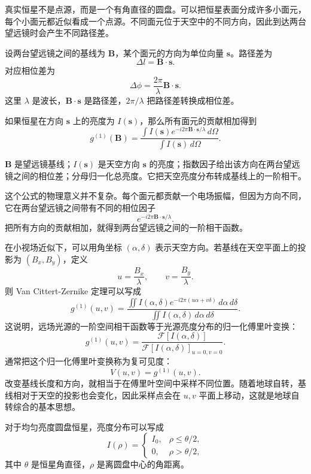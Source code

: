 真实恒星不是点源，而是一个有角直径的圆盘。可以把恒星表面分成许多小面元，每个小面元都近似看成一个点源。不同面元位于天空中的不同方向，因此到达两台望远镜时会产生不同路径差。

设两台望远镜之间的基线为 \(\mathbf B\)，某个面元的方向为单位向量 \(\mathbf s\)。路径差为
\[
  \Delta l=\mathbf B\cdot \mathbf s.
\]
对应相位差为
\[
  \Delta\phi
  =
  \frac{2\pi}{\lambda}\mathbf B\cdot\mathbf s.
\]
这里 \(\lambda\) 是波长，\(\mathbf B\cdot\mathbf s\) 是路径差，\(2\pi/\lambda\) 把路径差转换成相位差。

如果恒星在方向 \(\mathbf s\) 上的亮度为 \(I(\mathbf s)\)，那么所有面元的贡献相加得到
\[
  g^{(1)}(\mathbf B)
  =
  \frac{
    \int
    I(\mathbf s)
    e^{-i2\pi\mathbf B\cdot\mathbf s/\lambda}
    \,d\Omega
  }{
    \int
    I(\mathbf s)\,d\Omega
  }.
\]
\begin{formulaexplain}[空间相干解读]
\(\mathbf B\) 是望远镜基线；\(I(\mathbf s)\) 是天空方向 \(\mathbf s\) 的亮度；指数因子给出该方向在两台望远镜之间的相位差；分母归一化总亮度。它把天空亮度分布转成基线上的一阶相干。
\end{formulaexplain}
这个公式的物理意义并不复杂。每个面元都贡献一个电场振幅，但因为方向不同，它在两台望远镜之间带有不同的相位因子
\[
  e^{-i2\pi\mathbf B\cdot\mathbf s/\lambda}.
\]
把所有方向的贡献相加，就得到两台望远镜之间的一阶相干函数。

在小视场近似下，可以用角坐标 \((\alpha,\delta)\) 表示天空方向。若基线在天空平面上的投影为 \((B_x,B_y)\)，定义
\[
  u=\frac{B_x}{\lambda},
  \qquad
  v=\frac{B_y}{\lambda}.
\]
则 Van Cittert-Zernike 定理可以写成
\[
  g^{(1)}(u,v)
  =
  \frac{
    \iint
    I(\alpha,\delta)
    e^{-i2\pi(u\alpha+v\delta)}
    \,d\alpha\,d\delta
  }{
    \iint
    I(\alpha,\delta)
    \,d\alpha\,d\delta
  }.
\]
这说明，远场光源的一阶空间相干函数等于光源亮度分布的归一化傅里叶变换：
\[
  g^{(1)}(u,v)
  =
  \frac{
    \mathcal F[I(\alpha,\delta)]
  }{
    \mathcal F[I(\alpha,\delta)]_{u=0,v=0}
  }.
\]
通常把这个归一化傅里叶变换称为复可见度：
\[
  V(u,v)=g^{(1)}(u,v).
\]
改变基线长度和方向，就相当于在傅里叶空间中采样不同位置。随着地球自转，基线相对于天空的投影也会变化，因此采样点会在 \(u,v\) 平面上移动，这就是地球自转综合的基本思想。

对于均匀亮度圆盘恒星，亮度分布可以写成
\[
  I(\rho)=
  \begin{cases}
    I_0, & \rho\leq \theta/2,\\
    0, & \rho>\theta/2,
  \end{cases}
\]
其中 \(\theta\) 是恒星角直径，\(\rho\) 是离圆盘中心的角距离。

